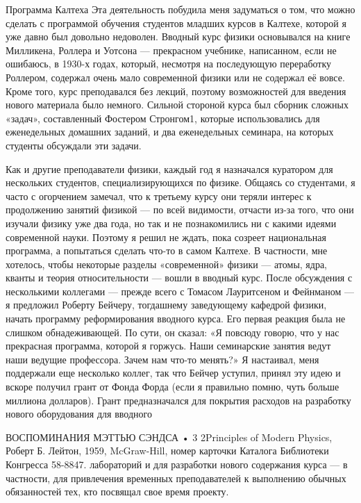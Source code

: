 \documentclass[10pt,oneside]{article}
\begin{document}
Программа Калтеха Эта деятельность побудила меня задуматься о том, что можно сделать с программой обучения студентов младших курсов в Калтехе, которой я уже давно был довольно недоволен. Вводный курс физики основывался на книге Милликена, Роллера и Уотсона --- прекрасном учебнике, написанном, если не ошибаюсь, в 1930-х годах, который, несмотря на последующую переработку Роллером, содержал очень мало современной физики или не содержал её вовсе. Кроме того, курс преподавался без лекций, поэтому возможностей для введения нового материала было немного. Сильной стороной курса был сборник сложных «задач», составленный Фостером Стронгом1, которые использовались для еженедельных домашних заданий, и два еженедельных семинара, на которых студенты обсуждали эти задачи.\par

Как и другие преподаватели физики, каждый год я назначался куратором для нескольких студентов, специализирующихся по физике. Общаясь со студентами, я часто с огорчением замечал, что к третьему курсу они теряли интерес к продолжению занятий физикой --- по всей видимости, отчасти из-за того, что они изучали физику уже два года, но так и не познакомились ни с какими идеями современной науки. Поэтому я решил не ждать, пока созреет национальная программа, а попытаться сделать что-то в самом Калтехе. В частности, мне хотелось, чтобы некоторые разделы «современной» физики --- атомы, ядра, кванты и теория относительности --- вошли в вводный курс. После обсуждения с несколькими коллегами --- прежде всего с Томасом Лауритсеном и Фейнманом --- я предложил Роберту Бейчеру, тогдашнему заведующему кафедрой физики, начать программу реформирования вводного курса. Его первая реакция была не слишком обнадеживающей. По сути, он сказал: «Я повсюду говорю, что у нас прекрасная программа, которой я горжусь. Наши семинарские занятия ведут наши ведущие профессора. Зачем нам что-то менять?» Я настаивал, меня поддержали еще несколько коллег, так что Бейчер уступил, принял эту идею и вскоре получил грант от Фонда Форда (если я правильно помню, чуть больше миллиона долларов). Грант предназначался для покрытия расходов на разработку нового оборудования для вводного\par

ВОСПОМИНАНИЯ МЭТТЬЮ СЭНДСА • 3 2Principles of Modern Physics, Роберт Б. Лейтон, 1959, McGraw-Hill, номер карточки Каталога Библиотеки Конгресса 58-8847. лабораторий и для разработки нового содержания курса --- в частности, для привлечения временных преподавателей к выполнению обычных обязанностей тех, кто посвящал свое время проекту.\par
\end{document}
